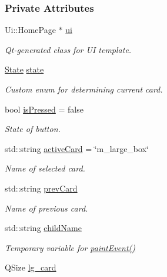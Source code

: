 \subsubsection*{Private Attributes}
\begin{DoxyCompactItemize}
\item 
Ui\+::\+Home\+Page $\ast$ \mbox{\hyperlink{classHomePage_ae5f1197f0c3aa11acf90d036ae4f91c7}{ui}}
\begin{DoxyCompactList}\small\item\em Qt-\/generated class for UI template. \end{DoxyCompactList}\item 
\mbox{\hyperlink{datatypes_8h_a5d74787dedbc4e11c1ab15bf487e61f8}{State}} \mbox{\hyperlink{classHomePage_a99cf5c5d03a03747ea209a27555f5687}{state}}
\begin{DoxyCompactList}\small\item\em Custom enum for determining current card. \end{DoxyCompactList}\item 
bool \mbox{\hyperlink{classHomePage_a30d025d463d4fac7cd65e375632c48d8}{is\+Pressed}} = false
\begin{DoxyCompactList}\small\item\em State of button. \end{DoxyCompactList}\item 
std\+::string \mbox{\hyperlink{classHomePage_aa62987c2e8b75ca00ae5967870670bd4}{active\+Card}} = \char`\"{}m\+\_\+large\+\_\+box\char`\"{}
\begin{DoxyCompactList}\small\item\em Name of selected card. \end{DoxyCompactList}\item 
std\+::string \mbox{\hyperlink{classHomePage_a1f64ec9c3e7b108095e87596675351d8}{prev\+Card}}
\begin{DoxyCompactList}\small\item\em Name of previous card. \end{DoxyCompactList}\item 
std\+::string \mbox{\hyperlink{classHomePage_a07abacb59d135ac5770492ac5ca0e0cf}{child\+Name}}
\begin{DoxyCompactList}\small\item\em Temporary variable for \mbox{\hyperlink{classHomePage_ab3daab17f753e46efcec8968333f88b5}{paint\+Event()}} \end{DoxyCompactList}\item 
Q\+Size \mbox{\hyperlink{classHomePage_a33542c9228f0a15c5a44eaeae67fb915}{lg\+\_\+card}}

\end{DoxyCompactItemize}

